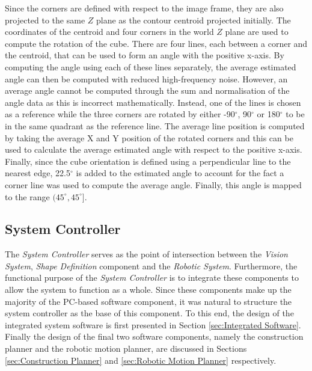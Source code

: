 Since the corners are defined with respect to the image frame, they are also projected to the same $Z$ plane as the contour centroid projected initially. The coordinates of the centroid and four corners in the world $Z$ plane are used to compute the rotation of the cube. There are four lines, each between a corner and the centroid, that can be used to form an angle with the positive x-axis. By computing the angle using each of these lines separately, the average estimated angle can then be computed with reduced high-frequency noise. However, an average angle cannot be computed through the sum and normalisation of the angle data as this is incorrect mathematically. Instead, one of the lines is chosen as a reference while the three corners are rotated by either -90$^{\circ}$,  90$^{\circ}$ or  180$^{\circ}$ to be in the same quadrant as the reference line. The average line position is computed by taking the average X and Y position of the rotated corners and this can be used to calculate the average estimated angle with respect to the positive x-axis. Finally, since the cube orientation is defined using a perpendicular line to the nearest edge, 22.5$^{\circ}$ is added to the estimated angle to account for the fact a corner line was used to compute the average angle. Finally, this angle is mapped to the range $(45^{\circ},45^{\circ}]$.


\subsection{System Controller} \label{sec:System Controller}

The \textit{System Controller} serves as the point of intersection between the \textit{Vision System}, \textit{Shape Definition} component and the \textit{Robotic System}. Furthermore, the functional purpose of the \textit{System Controller} is to integrate these components to allow the system to function as a whole. Since these components make up the majority of the PC-based software component, it was natural to structure the system controller as the base of this component. To this end, the design of the integrated system software is first presented in Section \ref{sec:Integrated Software}. Finally the design of the final two software components, namely the construction planner and the robotic motion planner, are discussed in Sections \ref{sec:Construction Planner} and \ref{sec:Robotic Motion Planner} respectively.

